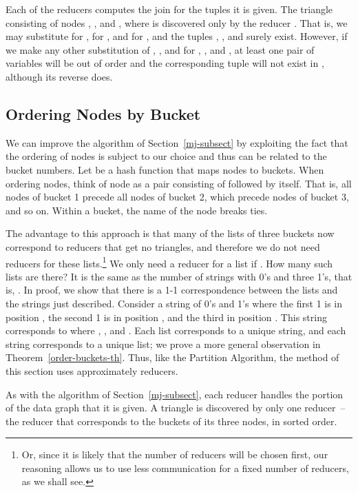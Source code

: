 Each of the  reducers computes the join for the tuples it is given.
The triangle consisting of nodes , , and , where  is discovered only by the reducer .  That is, we may substitute  for ,  for , and  for , and the tuples , , and  surely exist.  However, if we make any other substitution of , , and  for , , and , at least one pair of variables will be out of order and the corresponding tuple will not exist in , although its reverse does.

\subsection{Ordering Nodes by Bucket}
\label{improved-subsect}

We can improve the algorithm of Section~\ref{mj-subsect} by exploiting the fact that the ordering of nodes is subject to our choice and thus can be related to the bucket numbers.  Let  be a hash function that maps nodes to  buckets.  When ordering nodes, think of node  as a pair consisting of  followed by  itself.  That is, all nodes of bucket 1 precede all nodes of bucket 2, which precede nodes of bucket 3, and so on.  Within a bucket, the name of the node breaks ties.

The advantage to this approach is that many of the lists of three buckets now correspond to reducers that get no triangles, and therefore we do not need reducers for these lists.\footnote{Or, since it is likely that the number of reducers will be chosen first, our reasoning allows us to use less communication for a fixed number of reducers, as we shall see.}
We only need a reducer for a list  if .  How many such lists are there?  It is the same as the number of strings with  0's and three 1's, that is, .  In proof, we show that there is a 1-1 correspondence between the lists and the strings just described.  Consider a string of 0's and 1's where the first 1 is in position , the second 1 is in position , and the third in position .  This string corresponds to  where , , and .  Each list corresponds to a unique string, and each string corresponds to a unique list; we prove a more general observation in Theorem~\ref{order-buckets-th}.  Thus, like the Partition Algorithm, the method of this section uses approximately  reducers.

As with the algorithm of Section~\ref{mj-subsect}, each reducer handles the portion of the data graph that it is given.  A triangle is discovered by only one reducer~-- the reducer that corresponds to the buckets of its three nodes, in sorted order.


